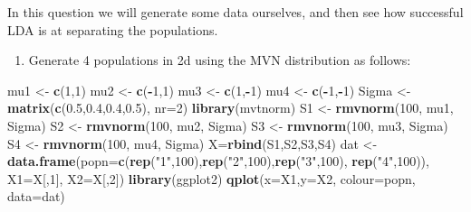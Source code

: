 \documentclass[
]{book}
\newenvironment{Shaded}{\begin{snugshade}}{\end{snugshade}}
\newcommand{\AttributeTok}[1]{\textcolor[rgb]{0.13,0.29,0.53}{#1}}
\newcommand{\DecValTok}[1]{\textcolor[rgb]{0.00,0.00,0.81}{#1}}
\newcommand{\FloatTok}[1]{\textcolor[rgb]{0.00,0.00,0.81}{#1}}
\newcommand{\FunctionTok}[1]{\textcolor[rgb]{0.13,0.29,0.53}{\textbf{#1}}}
\newcommand{\NormalTok}[1]{#1}
\newcommand{\OtherTok}[1]{\textcolor[rgb]{0.56,0.35,0.01}{#1}}
\newcommand{\SpecialCharTok}[1]{\textcolor[rgb]{0.81,0.36,0.00}{\textbf{#1}}}
\newcommand{\StringTok}[1]{\textcolor[rgb]{0.31,0.60,0.02}{#1}}
\providecommand{\tightlist}{%
  \setlength{\itemsep}{0pt}\setlength{\parskip}{0pt}}
\theoremstyle{definition}
\theoremstyle{definition}
\theoremstyle{definition}
\theoremstyle{definition}
\theoremstyle{remark}
\begin{document}
In this question we will generate some data ourselves, and then see how successful LDA is at separating the populations.

\begin{enumerate}
\def\labelenumi{\roman{enumi}.}
\tightlist
\item
  Generate 4 populations in 2d using the MVN distribution as follows:
\end{enumerate}

\begin{Shaded}
\begin{Highlighting}[]
\NormalTok{mu1 }\OtherTok{\textless{}{-}} \FunctionTok{c}\NormalTok{(}\DecValTok{1}\NormalTok{,}\DecValTok{1}\NormalTok{)}
\NormalTok{mu2 }\OtherTok{\textless{}{-}} \FunctionTok{c}\NormalTok{(}\SpecialCharTok{{-}}\DecValTok{1}\NormalTok{,}\DecValTok{1}\NormalTok{)}
\NormalTok{mu3 }\OtherTok{\textless{}{-}} \FunctionTok{c}\NormalTok{(}\DecValTok{1}\NormalTok{,}\SpecialCharTok{{-}}\DecValTok{1}\NormalTok{)}
\NormalTok{mu4 }\OtherTok{\textless{}{-}} \FunctionTok{c}\NormalTok{(}\SpecialCharTok{{-}}\DecValTok{1}\NormalTok{,}\SpecialCharTok{{-}}\DecValTok{1}\NormalTok{)}
\NormalTok{Sigma }\OtherTok{\textless{}{-}} \FunctionTok{matrix}\NormalTok{(}\FunctionTok{c}\NormalTok{(}\FloatTok{0.5}\NormalTok{,}\FloatTok{0.4}\NormalTok{,}\FloatTok{0.4}\NormalTok{,}\FloatTok{0.5}\NormalTok{), }\AttributeTok{nr=}\DecValTok{2}\NormalTok{)}
\FunctionTok{library}\NormalTok{(mvtnorm)}
\NormalTok{S1 }\OtherTok{\textless{}{-}} \FunctionTok{rmvnorm}\NormalTok{(}\DecValTok{100}\NormalTok{, mu1, Sigma)}
\NormalTok{S2 }\OtherTok{\textless{}{-}} \FunctionTok{rmvnorm}\NormalTok{(}\DecValTok{100}\NormalTok{, mu2, Sigma)}
\NormalTok{S3 }\OtherTok{\textless{}{-}} \FunctionTok{rmvnorm}\NormalTok{(}\DecValTok{100}\NormalTok{, mu3, Sigma)}
\NormalTok{S4 }\OtherTok{\textless{}{-}} \FunctionTok{rmvnorm}\NormalTok{(}\DecValTok{100}\NormalTok{, mu4, Sigma)}
\NormalTok{X}\OtherTok{=}\FunctionTok{rbind}\NormalTok{(S1,S2,S3,S4)}
\NormalTok{dat }\OtherTok{\textless{}{-}} \FunctionTok{data.frame}\NormalTok{(}\AttributeTok{popn=}\FunctionTok{c}\NormalTok{(}\FunctionTok{rep}\NormalTok{(}\StringTok{"1"}\NormalTok{,}\DecValTok{100}\NormalTok{),}\FunctionTok{rep}\NormalTok{(}\StringTok{"2"}\NormalTok{,}\DecValTok{100}\NormalTok{),}\FunctionTok{rep}\NormalTok{(}\StringTok{"3"}\NormalTok{,}\DecValTok{100}\NormalTok{),}
                         \FunctionTok{rep}\NormalTok{(}\StringTok{"4"}\NormalTok{,}\DecValTok{100}\NormalTok{)), }\AttributeTok{X1=}\NormalTok{X[,}\DecValTok{1}\NormalTok{], }\AttributeTok{X2=}\NormalTok{X[,}\DecValTok{2}\NormalTok{])}
\FunctionTok{library}\NormalTok{(ggplot2)}
\FunctionTok{qplot}\NormalTok{(}\AttributeTok{x=}\NormalTok{X1,}\AttributeTok{y=}\NormalTok{X2, }\AttributeTok{colour=}\NormalTok{popn, }\AttributeTok{data=}\NormalTok{dat)}
\end{Highlighting}
\end{Shaded}
\end{document}

